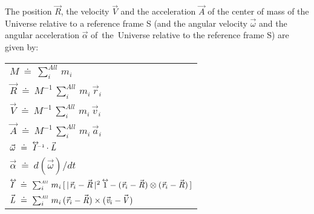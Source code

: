 \documentclass[10pt]{article}
\begin{document}
\par \bigskip \noindent The position ${\vec{\mathit{R}}}$, the velocity ${\vec{\mathit{V}}}$ and the acceleration ${\vec{\mathit{A}}}$ of the center of mass of the Universe relative to a reference frame S (and the angular velocity ${\vec{\omega}}$ and the angular acceleration ${\vec{\alpha}}$ \hbox {of the Universe} relative to the reference frame S) are given by:

\par \bigskip\smallskip \hspace{-2.40em} \begin{tabular}{l}
${\mathit{M}} ~\doteq~ \sum_i^{\scriptscriptstyle{\mathit{All}}} \, m_i$ \vspace{+1.20em} \\
${\vec{\mathit{R}}} ~\doteq~ {\mathit{M}}^{\scriptscriptstyle -1} \, \sum_i^{\scriptscriptstyle{\mathit{All}}} \, m_i \, {\vec{\mathit{r}}_{i}}$ \vspace{+1.20em} \\
${\vec{\mathit{V}}} ~\doteq~ {\mathit{M}}^{\scriptscriptstyle -1} \, \sum_i^{\scriptscriptstyle{\mathit{All}}} \, m_i \, {\vec{\mathit{v}}_{i}}$ \vspace{+1.20em} \\
${\vec{\mathit{A}}} ~\doteq~ {\mathit{M}}^{\scriptscriptstyle -1} \, \sum_i^{\scriptscriptstyle{\mathit{All}}} \, m_i \, {\vec{\mathit{a}}_{i}}$ \vspace{+1.20em} \\
${\vec{\omega}} ~\doteq~ {\mathit{I}}^{\scriptscriptstyle -1}{\vphantom{\sum_1^2}}^{\hspace{-1.500em}\leftrightarrow}\hspace{+0.600em} \cdot {\vec{\mathit{L}}}$ \vspace{+1.20em} \\
${\vec{\alpha}} ~\doteq~ d({\vec{\omega}})/dt$ \vspace{+1.20em} \\
${\mathit{I}}{\vphantom{\sum_1^2}}^{\hspace{-0.555em}\leftrightarrow}\hspace{-0.210em} ~\doteq~ \sum_i^{\scriptscriptstyle{\mathit{All}}} \, m_i \, [ \, |\hspace{+0.090em}{\vec{\mathit{r}}_{i}} - {\vec{\mathit{R}}}\,|^2 \hspace{+0.309em} {\mathrm{1}}{\vphantom{\sum_1^2}}^{\hspace{-0.639em}\leftrightarrow}\hspace{-0.129em} - ({\vec{\mathit{r}}_{i}} - {\vec{\mathit{R}}}) \otimes ({\vec{\mathit{r}}_{i}} - {\vec{\mathit{R}}}) \, ]$ \vspace{+1.20em} \\
${\vec{\mathit{L}}} ~\doteq~ \sum_i^{\scriptscriptstyle{\mathit{All}}} \, m_i \, ({\vec{\mathit{r}}_{i}} - {\vec{\mathit{R}}}) \times ({\vec{\mathit{v}}_{i}} - \hspace{-0.120em}{\vec{\mathit{V}}})$
\end{tabular}
\end{document}
